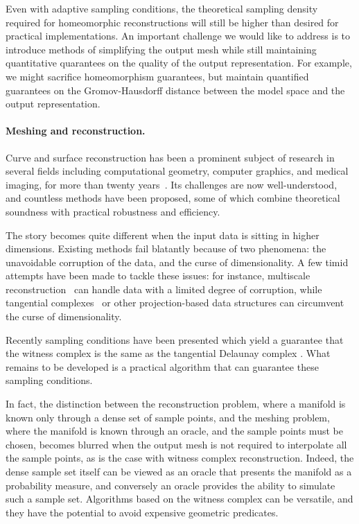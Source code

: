 Even with adaptive sampling conditions, the theoretical sampling
density required for homeomorphic reconstructions will still be higher
than desired for practical implementations. An important challenge we
would like to address is to introduce methods of simplifying the
output mesh while still maintaining quantitative quarantees on the
quality of the output representation. For example, we might sacrifice
homeomorphism guarantees, but maintain quantified guarantees on the
Gromov-Hausdorff distance between the model space and the output
representation. 


\paragraph{Meshing and reconstruction.}
Curve and surface reconstruction has been a prominent subject of
research in several fields including computational geometry, computer
graphics, and medical imaging, for more than twenty
years~\cite{dey-csr-2007}. Its challenges are now well-understood, and
countless methods have been proposed, some of which combine
theoretical soundness with practical robustness and efficiency.

The story becomes quite different when the input data is sitting in
higher dimensions. Existing methods fail blatantly because of two
phenomena: the unavoidable corruption of the data, and the curse of
dimensionality. A few timid attempts have been made to tackle these
issues: for instance, multiscale
reconstruction~\cite{geometrica-bgo-09} can handle data with a limited
degree of corruption, while tangential
complexes~\cite{geometrica-7142i} or other projection-based data
structures can circumvent the curse of dimensionality. 

Recently sampling conditions have been presented which yield a
guarantee that the witness complex is the same as the tangential
Delaunay complex \cite{boissonnat2011cgl,boissonnat2012stab}. What
remains to be developed is a practical algorithm that can guarantee
these sampling conditions.

In fact, the distinction between the reconstruction problem, where a
manifold is known only through a dense set of sample points, and the
meshing problem, where the manifold is known through an oracle, and
the sample points must be chosen, becomes blurred when the output mesh
is not required to interpolate all the sample points, as is the case
with witness complex reconstruction. Indeed, the dense sample set
itself can be viewed as an oracle that presents the manifold as a
probability measure, and conversely an oracle provides the ability to
simulate such a sample set. Algorithms based on the witness complex
can be versatile, and they have the potential to avoid expensive
geometric predicates.

